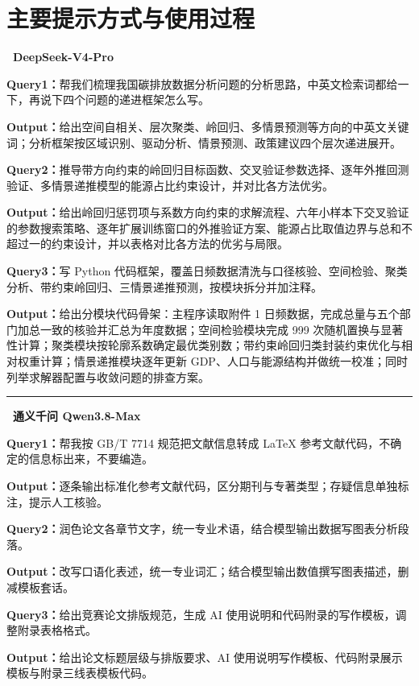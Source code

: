 \documentclass[12pt,a4paper]{ctexart}
\begin{document}
\section{主要提示方式与使用过程}

\noindent\textbf{\textbullet~DeepSeek-V4-Pro}

\textbf{Query1：}帮我们梳理我国碳排放数据分析问题的分析思路，中英文检索词都给一下，再说下四个问题的递进框架怎么写。

\textbf{Output：}给出空间自相关、层次聚类、岭回归、多情景预测等方向的中英文关键词；分析框架按区域识别、驱动分析、情景预测、政策建议四个层次递进展开。

\textbf{Query2：}推导带方向约束的岭回归目标函数、交叉验证参数选择、逐年外推回测验证、多情景递推模型的能源占比约束设计，并对比各方法优劣。

\textbf{Output：}给出岭回归惩罚项与系数方向约束的求解流程、六年小样本下交叉验证的参数搜索策略、逐年扩展训练窗口的外推验证方案、能源占比取值边界与总和不超过一的约束设计，并以表格对比各方法的优劣与局限。

\textbf{Query3：}写 Python 代码框架，覆盖日频数据清洗与口径核验、空间检验、聚类分析、带约束岭回归、三情景递推预测，按模块拆分并加注释。

\textbf{Output：}给出分模块代码骨架：主程序读取附件 1 日频数据，完成总量与五个部门加总一致的核验并汇总为年度数据；空间检验模块完成 999 次随机置换与显著性计算；聚类模块按轮廓系数确定最优类别数；带约束岭回归类封装约束优化与相对权重计算；情景递推模块逐年更新 GDP、人口与能源结构并做统一校准；同时列举求解器配置与收敛问题的排查方案。

\noindent\rule{\linewidth}{0.4pt}

\noindent\textbf{\textbullet~通义千问 Qwen3.8-Max}

\textbf{Query1：}帮我按 GB/T 7714 规范把文献信息转成 LaTeX 参考文献代码，不确定的信息标出来，不要编造。

\textbf{Output：}逐条输出标准化参考文献代码，区分期刊与专著类型；存疑信息单独标注，提示人工核验。

\textbf{Query2：}润色论文各章节文字，统一专业术语，结合模型输出数据写图表分析段落。

\textbf{Output：}改写口语化表述，统一专业词汇；结合模型输出数值撰写图表描述，删减模板套话。

\textbf{Query3：}给出竞赛论文排版规范，生成 AI 使用说明和代码附录的写作模板，调整附录表格格式。

\textbf{Output：}给出论文标题层级与排版要求、AI 使用说明写作模板、代码附录展示模板与附录三线表模板代码。
\end{document}
